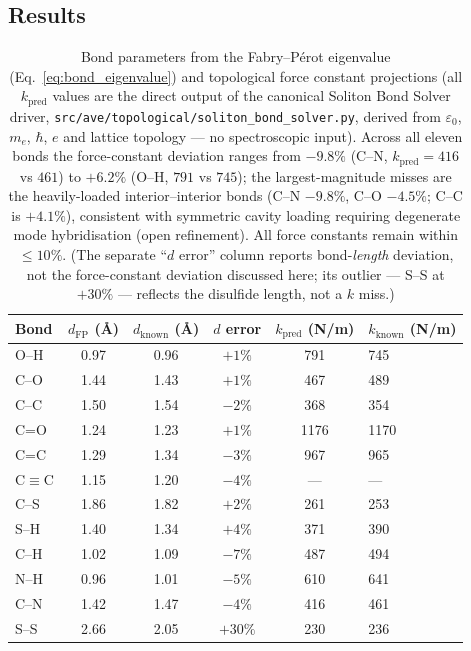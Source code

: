 \subsection{Results}

\begin{table}[h]
\centering
\begin{tabularx}{\textwidth}{@{}lccccX@{}}
\hline
\textbf{Bond} & $d_\text{FP}$ (\AA) & $d_\text{known}$ (\AA) & $d$ error & $k_\text{pred}$ (N/m) & $k_\text{known}$ (N/m) \\
\hline
O--H  & 0.97  & 0.96  & $+1\%$   & 791   & 745   \\
C--O  & 1.44  & 1.43  & $+1\%$  & 467   & 489   \\
C--C  & 1.50  & 1.54  & $-2\%$  & 368   & 354   \\
C=O   & 1.24  & 1.23  & $+1\%$   & 1176  & 1170  \\
C=C   & 1.29  & 1.34  & $-3\%$   & 967   & 965   \\
C$\equiv$C& 1.15  & 1.20  & $-4\%$   & ---   & ---   \\
C--S  & 1.86  & 1.82  & $+2\%$   & 261   & 253   \\
S--H  & 1.40  & 1.34  & $+4\%$   & 371   & 390   \\
C--H  & 1.02  & 1.09  & $-7\%$  & 487   & 494   \\
N--H  & 0.96  & 1.01  & $-5\%$   & 610   & 641   \\
C--N  & 1.42  & 1.47  & $-4\%$  & 416   & 461   \\
S--S  & 2.66  & 2.05  & $+30\%$  & 230   & 236   \\
\hline
\end{tabularx}
\caption{Bond parameters from the Fabry--P\'{e}rot eigenvalue (Eq.~\ref{eq:bond_eigenvalue}) and topological force constant projections (all $k_\text{pred}$ values are the direct output of the canonical Soliton Bond Solver driver, \texttt{src/ave/topological/soliton\_bond\_solver.py}, derived from $\varepsilon_0$, $m_e$, $\hbar$, $e$ and lattice topology --- no spectroscopic input). Across all eleven bonds the force-constant deviation ranges from $-9.8\%$ (C--N, $k_\text{pred}=416$ vs $461$) to $+6.2\%$ (O--H, $791$ vs $745$); the largest-magnitude misses are the heavily-loaded interior--interior bonds (C--N $-9.8\%$, C--O $-4.5\%$; C--C is $+4.1\%$), consistent with symmetric cavity loading requiring degenerate mode hybridisation (open refinement). All force constants remain within $\leq 10\%$. (The separate ``$d$ error'' column reports bond-\emph{length} deviation, not the force-constant deviation discussed here; its outlier --- S--S at $+30\%$ --- reflects the disulfide length, not a $k$ miss.)}
\label{tab:first_principles_k}
\end{table}

